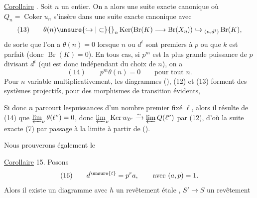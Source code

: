 \uline{Corollaire} . Soit $n$ un entier. On a alors une suite exacte canonique
où $Q_n=\operatorname{Coker}u_n$ s'insère dans une suite exacte canonique
avec
\[
(13)\qquad\theta(n)\unsure{\hookrightarrow|\subset}{}_n\operatorname{Ker}(\operatorname{Br}(K)\longrightarrow\operatorname{Br}(X_\eta))\hookrightarrow{}_{(n,d^t)}\operatorname{Br}(K),
\]
de sorte que l'on a $\theta(n)=0$ lorsque $n$ ou $d^t$ sont premiers à $p$ ou que $k$ est parfait (donc $\operatorname{Br}(K)=0$). En tous cas, si $p^m$ est la plus grande puissance de $p$ divisant $d^t$ (qui est donc indépendant du choix de $n$), on a
\[
(14)\qquad p^m\theta(n)=0\qquad\text{pour tout }n.
\]
Pour $n$ variable multiplicativement, les  diagrammes (), (12) et (13) forment des systèmes projectifs, pour des morphismes de transition évidents, 

Si donc $n$ parcourt lespuissances d'un nombre premier fixé $\ell$, alors il résulte de (14) que $\varprojlim_\nu\theta(\ell^\nu)=0$,  donc $\varprojlim_\nu\operatorname{Ker}w_{\ell^\nu}\xrightarrow{\sim}\varprojlim Q(\ell^\nu)$  par (12), d'où la suite exacte (7) par passage à la limite à partir de ().

Nous prouverons également le

\uline{Corollaire} 15. Posons
\[
(16)\qquad d^{\unsure{t}}=p^r a,\qquad\text{avec }(a,p)=1.
\]
Alors il existe un  diagramme
avec $h$ un revêtement étale , $S'\longrightarrow S$ un revêtement

